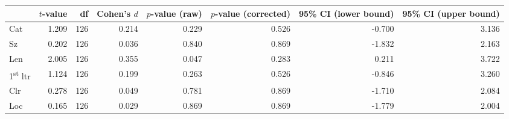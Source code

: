 \begin{tabular}{lrrrrrrr}
\toprule
 & $t$-value & df & Cohen's $d$ & $p$-value (raw) & $p$-value (corrected) & 95\% CI (lower bound) & 95\% CI (upper bound) \\
\midrule
 Cat & 1.209 & 126 & 0.214 & 0.229 & 0.526 & -0.700 & 3.136 \\
 Sz & 0.202 & 126 & 0.036 & 0.840 & 0.869 & -1.832 & 2.163 \\
\rowcolor[HTML]{f5f5f5} Len & 2.005 & 126 & 0.355 & 0.047 & 0.283 & 0.211 & 3.722 \\
 1\textsuperscript{st} ltr & 1.124 & 126 & 0.199 & 0.263 & 0.526 & -0.846 & 3.260 \\
 Clr & 0.278 & 126 & 0.049 & 0.781 & 0.869 & -1.710 & 2.084 \\
 Loc & 0.165 & 126 & 0.029 & 0.869 & 0.869 & -1.779 & 2.004 \\
\bottomrule
\end{tabular}